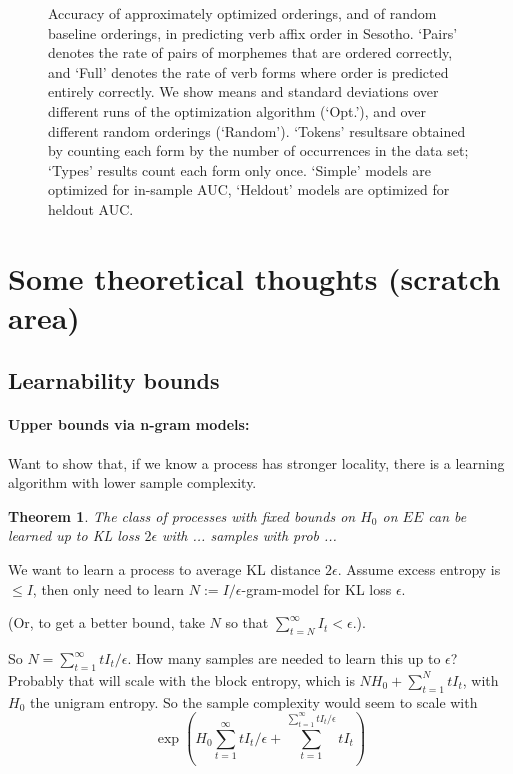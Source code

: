 \documentclass[11pt,letterpaper]{article}
\newcounter{theorem}
\newtheorem{thm}[theorem]{Theorem}
\begin{document}
\begin{figure}
\begin{tabular}{cccc||ll|ll}
\end{tabular}
\caption{Accuracy of approximately optimized orderings, and of random baseline orderings, in predicting verb affix order in Sesotho. `Pairs' denotes the rate of pairs of morphemes that are ordered correctly, and `Full' denotes the rate of verb forms where order is predicted entirely correctly. We show means and standard deviations over different runs of the optimization algorithm (`Opt.'), and over different random orderings (`Random'). `Tokens' resultsare obtained by counting each form by the number of occurrences in the data set; `Types' results count each form only once. `Simple' models are optimized for in-sample AUC, `Heldout' models are optimized for heldout AUC.}\label{fig:acc-sesotho}
\end{figure}






\section{Some theoretical thoughts (scratch area)}
\subsection{Learnability bounds}

\paragraph{Upper bounds via n-gram models:}
Want to show that, if we know a process has stronger locality, there is a learning algorithm with lower sample complexity.

\begin{thm}
The class of processes with fixed bounds on $H_0$ on $EE$ can be learned up to KL loss $2\epsilon$ with ... samples with prob ...
\end{thm}

We want to learn a process to average KL distance $2\epsilon$.
Assume excess entropy is $\leq I$, then only need to learn $N := I/\epsilon$-gram-model for KL loss $\epsilon$.

(Or, to get a better bound, take $N$ so that $\sum_{t=N}^\infty I_t < \epsilon$.).

So $N = \sum_{t=1}^\infty t I_t/\epsilon$.
How many samples are needed to learn this up to $\epsilon$? Probably that will scale with the block entropy, which is $N H_0 + \sum_{t=1}^N t I_t$, with $H_0$ the unigram entropy.
So the sample complexity would seem to scale with
$$\exp\left(H_0 \sum_{t=1}^\infty t I_t/\epsilon + \sum_{t=1}^{\sum_{t=1}^\infty t I_t/\epsilon} t I_t\right)$$
\end{document}

